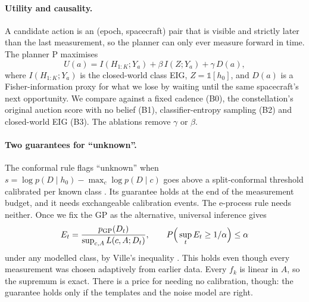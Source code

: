 \documentclass{jaa}
\begin{document}
\paragraph{Utility and causality.} A candidate action is an (epoch, spacecraft) pair that is visible and strictly later than the last measurement, so the planner can only ever measure forward in time. The planner P maximises
\begin{equation}
U(a) = I(H_{1:K};Y_a) + \beta\, I(Z;Y_a) + \gamma\, D(a),
\label{eq:utility}
\end{equation}
where $I(H_{1:K};Y_a)$ is the closed-world class EIG, $Z=\mathbb 1[h_0]$, and $D(a)$ is a Fisher-information proxy for what we lose by waiting until the same spacecraft's next opportunity. We compare against a fixed cadence (B0), the constellation's original auction score with no belief (B1), classifier-entropy sampling (B2) and closed-world EIG (B3). The ablations remove $\gamma$ or $\beta$.

\paragraph{Two guarantees for ``unknown''.} The conformal rule flags ``unknown'' when $s=\log p(D\mid h_0)-\max_c\log p(D\mid c)$ goes above a split-conformal threshold calibrated per known class \citep{Vovk2005,Angelopoulos2023}. Its guarantee holds at the end of the measurement budget, and it needs exchangeable calibration events. The e-process rule needs neither. Once we fix the GP as the alternative, universal inference \citep{Wasserman2020} gives
\begin{equation}
E_t=\frac{p_{\rm GP}(D_t)}{\sup_{c,A}L(c,A;D_t)},\qquad P\Big(\sup_t E_t\ge 1/\alpha\Big)\le\alpha
\label{eq:eprocess}
\end{equation}
under any modelled class, by Ville's inequality \citep{Ramdas2023}. This holds even though every measurement was chosen adaptively from earlier data. Every $f_k$ is linear in $A$, so the supremum is exact. There is a price for needing no calibration, though: the guarantee holds only if the templates and the noise model are right.
\end{document}
